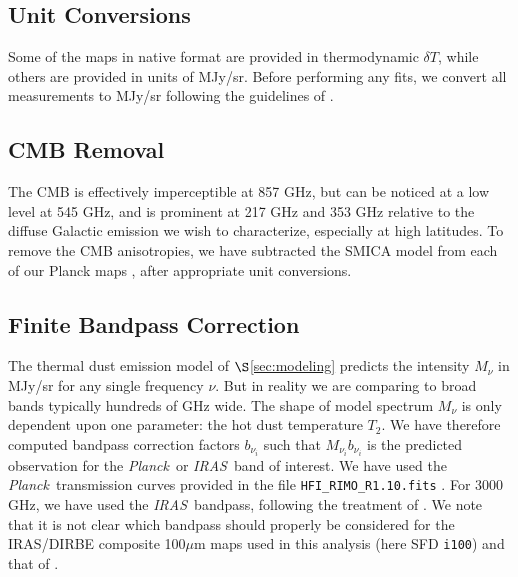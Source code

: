 \documentclass{emulateapj}
\newcommand{\IRAS}{{\it IRAS}}
\newcommand{\PLANCK}{{\it Planck}}
\begin{document}
\subsection{Unit Conversions}

Some of the maps in native format are provided in thermodynamic $\delta T$, 
while others are provided in units of MJy/sr. Before performing any fits, 
we convert all measurements to MJy/sr following the guidelines of \cite{planckresponse}.



\subsection{CMB Removal}
The CMB is effectively imperceptible at 857 GHz, but can be noticed at a 
low level at 545 GHz, and is prominent at 217 GHz and 353 GHz relative 
to the diffuse Galactic emission we wish to characterize, especially at high
latitudes. To remove the CMB anisotropies, we have subtracted the SMICA model
from each of our Planck maps \citep{smica}, after appropriate unit conversions.

\subsection{Finite Bandpass Correction}
The thermal dust emission model of $\S$\ref{sec:modeling} predicts the 
intensity $M_{\nu}$ in MJy/sr for any single frequency $\nu$. But in reality
we are comparing to broad bands typically hundreds of GHz wide. The shape of 
model spectrum $M_{\nu}$ is only dependent upon one parameter: the hot
dust temperature $T_2$. We have therefore computed bandpass correction factors
$b_{\nu_i}$ such that $M_{\nu_i}b_{\nu_i}$ is the predicted observation for the
\PLANCK~or \IRAS~band of interest. We have used the \PLANCK~transmission 
curves provided in the file \verb|HFI_RIMO_R1.10.fits| \citep{planckresponse}. 
For 3000 GHz, we have used the \IRAS~bandpass, following the treatment of
\cite{planckdust}. We note that it is not clear which bandpass should
properly be considered for the IRAS/DIRBE composite 100$\mu$m maps used in 
this analysis (here SFD \verb|i100|) and that of \cite{planckdust}.
\end{document}
